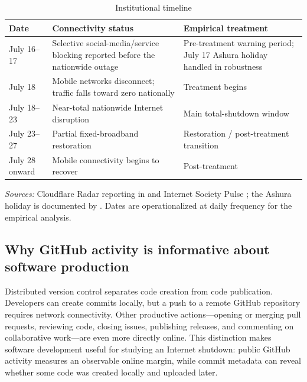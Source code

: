 \begin{table}[htbp]
\centering
\small
\caption{Institutional timeline}
\label{tab:timeline}
\begin{threeparttable}
\begin{tabular}{@{}p{}p{}p{}@{}}
\toprule
Date & Connectivity status & Empirical treatment \\
\midrule
July 16--17 & Selective social-media/service blocking reported before the nationwide outage \citep{isoc2024} & Pre-treatment warning period; July 17 Ashura holiday handled in robustness \citep{dailystar2024ashura} \\
July 18 & Mobile networks disconnect; traffic falls toward zero nationally & Treatment begins \\
July 18--23 & Near-total nationwide Internet disruption & Main total-shutdown window \\
July 23--27 & Partial fixed-broadband restoration & Restoration / post-treatment transition \\
July 28 onward & Mobile connectivity begins to recover & Post-treatment \\
\bottomrule
\end{tabular}
\begin{tablenotes}[flushleft]
\footnotesize
\item \textit{Sources:} Cloudflare Radar reporting in \citet{belson2024} and Internet Society Pulse \citep{isoc2024}; the Ashura holiday is documented by \citet{dailystar2024ashura}. Dates are operationalized at daily frequency for the empirical analysis.
\end{tablenotes}
\end{threeparttable}
\end{table}

\subsection{Why GitHub activity is informative about software production}
\label{sec:github}

Distributed version control separates code creation from code publication. Developers can create commits locally, but a push to a remote GitHub repository requires network connectivity. Other productive actions---opening or merging pull requests, reviewing code, closing issues, publishing releases, and commenting on collaborative work---are even more directly online. This distinction makes software development useful for studying an Internet shutdown: public GitHub activity measures an observable online margin, while commit metadata can reveal whether some code was created locally and uploaded later.

